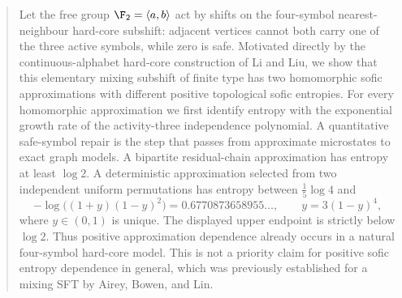 \begin{abstract}
Let the free group $\F_2=\langle a,b\rangle$ act by shifts on the
four-symbol nearest-neighbour hard-core subshift: adjacent vertices cannot
both carry one of the three active symbols, while zero is safe.  Motivated
directly by the continuous-alphabet hard-core construction of Li and Liu, we
show that this elementary mixing subshift of finite type has two homomorphic
sofic approximations with different positive topological sofic entropies.
For every homomorphic approximation we first identify entropy with the
exponential growth rate of the activity-three independence polynomial.  A
quantitative safe-symbol repair is the step that passes from approximate
microstates to exact graph models.  A bipartite residual-chain approximation
has entropy at least $\log 2$.  A deterministic approximation selected from
two independent uniform permutations has entropy between
$\frac15\log4$ and
\[
 -\log\bigl((1+y)(1-y)^2\bigr)
 =0.6770873658955\ldots,
 \qquad y=3(1-y)^4,
\]
where $y\in(0,1)$ is unique.  The displayed upper endpoint is strictly below
$\log2$.  Thus positive approximation dependence already occurs in a natural
four-symbol hard-core model.  This is not a priority claim for positive sofic
entropy dependence in general, which was previously established for a mixing
SFT by Airey, Bowen, and Lin.
\end{abstract}


